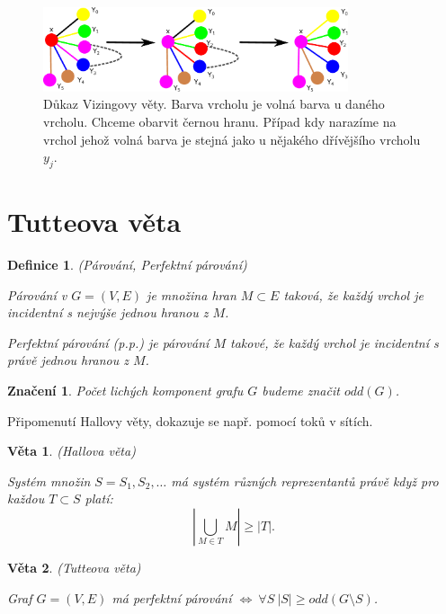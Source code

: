 \documentclass[a4paper,10pt,titlepage]{article} \usepackage[utf8]{inputenc}
\newtheorem{theorem}{Věta}
\newtheorem{define}{Definice}
\newtheorem*{notation}{Značení}
\begin{document}
\begin{figure}[h!]
	\centerline{\mbox{\includegraphics[width=0.80\textwidth]{pics/VIZING2.eps}}}
	\caption{Důkaz Vizingovy věty. Barva vrcholu je volná barva u daného vrcholu. Chceme obarvit černou hranu.
			Případ kdy narazíme na vrchol jehož volná barva je stejná jako u nějakého dřívějšího vrcholu $y_j$.
	} 
	\label{vizing_obr2}
\end{figure}

\medskip

\section{Tutteova věta}

\begin{define}
(Párování, Perfektní párování)

Párování v $G=(V,E)$ je množina hran $M \subset E$ taková, že každý vrchol je incidentní s nejvýše jednou hranou z $M$.

Perfektní párování (p.p.) je párování $M$ takové, že každý vrchol je incidentní s právě jednou hranou z $M$.
\end{define}

\begin{notation}
Počet lichých komponent grafu $G$ budeme značit $odd(G)$.
\end{notation}

Připomenutí Hallovy věty, dokazuje se např. pomocí toků v sítích.

\begin{theorem}
(Hallova věta)

Systém množin $S = {S_1, S_2, \ldots}$ má systém různých reprezentantů právě když pro každou $T \subset S$ platí:
\[
	\left|\bigcup_{M \in T}^{} M\right| \geq \left|T\right|.
\]
\end{theorem}


\begin{theorem}
(Tutteova věta)

Graf $G=(V,E)$ má perfektní párování $\Leftrightarrow \ \forall S \ |S| \geq odd(G\setminus S)$.
\end{theorem}
\end{document}
